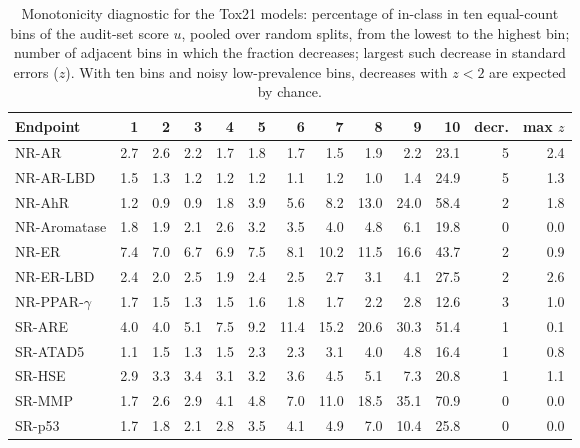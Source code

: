 \begin{table}[ht]
\centering
\caption{Monotonicity diagnostic for the Tox21 models: percentage of in-class in ten equal-count bins of the audit-set score $u$, pooled over random splits, from the lowest to the highest bin; number of adjacent bins in which the fraction decreases; largest such decrease in standard errors ($z$). With ten bins and noisy low-prevalence bins, decreases with $z<2$ are expected by chance.}
\label{tab:tox21mono}
\small
\setlength{\tabcolsep}{3pt}
\begin{tabular}{lrrrrrrrrrrrr}
\toprule
Endpoint & 1 & 2 & 3 & 4 & 5 & 6 & 7 & 8 & 9 & 10 & decr. & max $z$ \\
\midrule
NR-AR & 2.7 & 2.6 & 2.2 & 1.7 & 1.8 & 1.7 & 1.5 & 1.9 & 2.2 & 23.1 & 5 & 2.4 \\
NR-AR-LBD & 1.5 & 1.3 & 1.2 & 1.2 & 1.2 & 1.1 & 1.2 & 1.0 & 1.4 & 24.9 & 5 & 1.3 \\
NR-AhR & 1.2 & 0.9 & 0.9 & 1.8 & 3.9 & 5.6 & 8.2 & 13.0 & 24.0 & 58.4 & 2 & 1.8 \\
NR-Aromatase & 1.8 & 1.9 & 2.1 & 2.6 & 3.2 & 3.5 & 4.0 & 4.8 & 6.1 & 19.8 & 0 & 0.0 \\
NR-ER & 7.4 & 7.0 & 6.7 & 6.9 & 7.5 & 8.1 & 10.2 & 11.5 & 16.6 & 43.7 & 2 & 0.9 \\
NR-ER-LBD & 2.4 & 2.0 & 2.5 & 1.9 & 2.4 & 2.5 & 2.7 & 3.1 & 4.1 & 27.5 & 2 & 2.6 \\
NR-PPAR-$\gamma$ & 1.7 & 1.5 & 1.3 & 1.5 & 1.6 & 1.8 & 1.7 & 2.2 & 2.8 & 12.6 & 3 & 1.0 \\
SR-ARE & 4.0 & 4.0 & 5.1 & 7.5 & 9.2 & 11.4 & 15.2 & 20.6 & 30.3 & 51.4 & 1 & 0.1 \\
SR-ATAD5 & 1.1 & 1.5 & 1.3 & 1.5 & 2.3 & 2.3 & 3.1 & 4.0 & 4.8 & 16.4 & 1 & 0.8 \\
SR-HSE & 2.9 & 3.3 & 3.4 & 3.1 & 3.2 & 3.6 & 4.5 & 5.1 & 7.3 & 20.8 & 1 & 1.1 \\
SR-MMP & 1.7 & 2.6 & 2.9 & 4.1 & 4.8 & 7.0 & 11.0 & 18.5 & 35.1 & 70.9 & 0 & 0.0 \\
SR-p53 & 1.7 & 1.8 & 2.1 & 2.8 & 3.5 & 4.1 & 4.9 & 7.0 & 10.4 & 25.8 & 0 & 0.0 \\
\bottomrule
\end{tabular}
\end{table}
